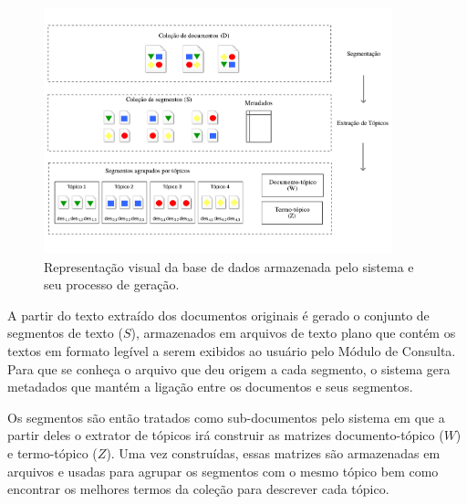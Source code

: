 	\begin{figure}[h!]
\center




		\includegraphics[trim={ 0 40 0 40 },clip,page=1,width=0.9\textwidth]{conteudo/capitulos/figs/estrutura-de-dados-interna-revisada.pdf}


		\caption{Representação visual da base de dados armazenada pelo sistema e seu processo de geração.}

		\label{fig:estrutura-dados-interna}
	\end{figure}




A partir do texto extraído dos documentos originais é gerado o conjunto de segmentos de texto ($S$), armazenados em arquivos de texto plano que contém os textos em formato legível a serem exibidos ao usuário pelo Módulo de Consulta. Para que se conheça o arquivo que deu origem a cada segmento, o sistema gera metadados que mantém a ligação entre os documentos e seus segmentos. 

Os segmentos são então tratados como sub-documentos pelo sistema em que a partir deles o extrator de tópicos irá construir as matrizes documento-tópico ($W$) e termo-tópico ($Z$). Uma vez construídas, essas matrizes são armazenadas em arquivos e usadas para agrupar os segmentos com o mesmo tópico bem como encontrar os melhores termos da coleção para descrever cada tópico.





